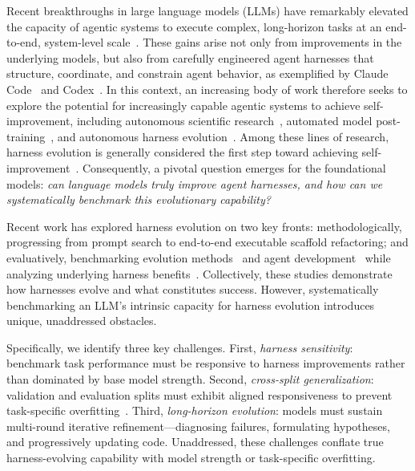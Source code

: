 Recent breakthroughs in large language models (LLMs) have remarkably elevated the capacity of agentic systems to execute complex, long-horizon tasks at an end-to-end, system-level scale~\cite{deepseekv4,glm5,anthropic2026opus,anthropic2026fable}. These gains arise not only from improvements in the underlying models, but also from carefully engineered agent harnesses that structure, coordinate, and constrain agent behavior, as exemplified by Claude Code~\cite{claudecode} and Codex~\cite{codex}.
In this context, an increasing body of work therefore seeks to explore  the potential for increasingly capable agentic systems to achieve self-improvement, including autonomous scientific research~\cite{alphaevolve}, automated model post-training~\cite{posttrainbench}, and autonomous harness evolution~\cite{dgm,metaharness,harnessx}. Among these lines of research, harness evolution is generally considered the first step toward achieving self-improvement~\cite{weng2026harness}.
Consequently, a pivotal question emerges for the foundational models: \emph{can language models truly improve agent harnesses, and how can we systematically benchmark this evolutionary capability?}

Recent work has explored harness evolution on two key fronts: methodologically, progressing from prompt search to end-to-end executable scaffold refactoring; and evaluatively, benchmarking evolution methods~\cite{seaeval,seagym} and agent development~\cite{mac} while analyzing underlying harness benefits~\cite{seaeval,seagym}. Collectively, these studies demonstrate how harnesses evolve and what constitutes success. However, systematically benchmarking an LLM's intrinsic capacity for harness evolution introduces unique, unaddressed obstacles.

Specifically, we identify three key challenges.
First, \emph{harness sensitivity}: benchmark task performance must be responsive to harness improvements rather than dominated by base model strength.
Second, \emph{cross-split generalization}: validation and evaluation splits must exhibit aligned responsiveness to prevent task-specific overfitting~\citep{rethinkingharnesseval}.
Third, \emph{long-horizon evolution}: models must sustain multi-round iterative refinement---diagnosing failures, formulating hypotheses, and progressively updating code.
Unaddressed, these challenges conflate true harness-evolving capability with model strength or task-specific overfitting.

